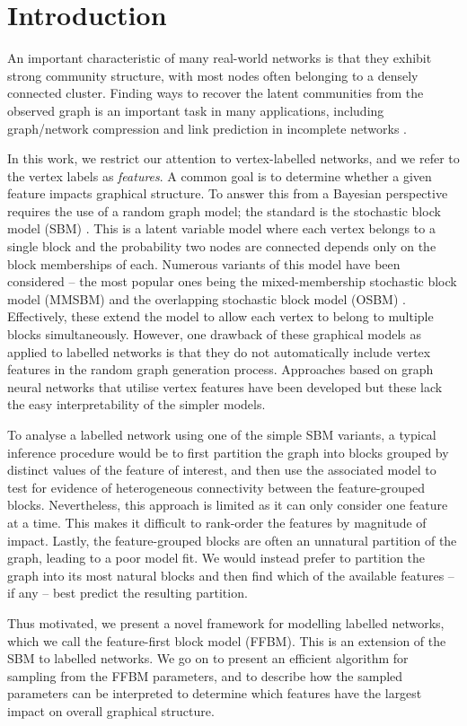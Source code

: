 \section{Introduction}

An important characteristic of many real-world networks is that they exhibit strong community structure, with most nodes often belonging to a densely connected cluster. 
Finding ways to recover the latent communities from the observed graph is an important
task in many applications, including
graph/network compression \cite{cluster-compression} and link prediction in 
incomplete networks \cite{link-prediction}.

In this work, we
restrict our attention to vertex-labelled networks, and we
refer to the vertex labels as {\em features}. A common goal is to determine whether a given feature impacts graphical structure. To answer this from a Bayesian perspective requires the use of a random graph model; the standard is the stochastic block model (SBM) \cite{vanilla-sbm}. This is a latent variable model where each vertex belongs to a single block and the probability two nodes are connected depends only on the block memberships of each. Numerous variants of this 
model have been considered -- the most popular ones being the mixed-membership stochastic block model (MMSBM) \cite{mixed-membership-sbm} and the overlapping stochastic block model (OSBM) \cite{overlapping-sbm}. Effectively, these extend the model to allow each vertex to belong to multiple blocks simultaneously. However, one drawback of these graphical models as applied to labelled networks is that they do not automatically include vertex features in the random graph generation process. Approaches based on graph neural networks \cite{sbm-gnn} that utilise vertex features have been developed but these lack the easy interpretability of the simpler models.

To analyse a labelled network using one of the simple SBM variants, a typical inference procedure would be to first partition the graph into blocks grouped by distinct values of the feature of interest, and then use the associated model to test for evidence of heterogeneous connectivity between the feature-grouped blocks. Nevertheless, this approach is limited as it can only consider one feature at a time. This makes it difficult to rank-order the features by  magnitude of impact. Lastly, the feature-grouped blocks are often an unnatural partition of the graph, leading to a poor model fit. We would instead prefer to partition the graph into its most natural blocks and then find which of the available features -- if any -- best predict the resulting partition.

Thus motivated, we present a novel framework for modelling labelled networks, which we call the feature-first block model (FFBM). This is an extension of the SBM to labelled networks. We go on to present an efficient algorithm for sampling from the FFBM parameters, and to describe how the sampled parameters can be interpreted to determine which features have the largest impact on overall graphical structure.
